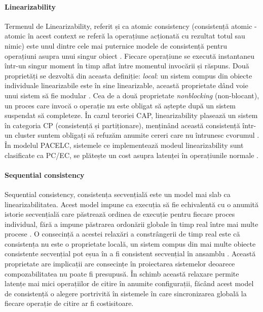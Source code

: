 \paragraph{Linearizability}

Termenul de Linearizability, referit și ca atomic consistency (consistență atomic - atomic în acest context se referă la operațiune acționată cu rezultat totul sau nimic) este unul dintre cele mai puternice modele de consistență pentru operațiuni asupra unui singur obiect \cite{herlihy1990}. Fiecare operațiune se execută instantaneu într-un singur moment în timp aflat între momentul invocării și răspuns. Două proprietăți se dezvoltă din aceasta definiție: \textit{local}: un sistem compus din obiecte individuale linearizabile este în sine linearizable, această proprietate dând voie unui sistem să fie modular \cite{herlihy1990}. Cea de a două proprietate \textit{nonblocking} (non-blocant), un proces care invocă o operație nu este obligat să aștepte după un sistem suspendat să completeze. În cazul teroriei CAP, linearizability plasează un sistem în categoria CP (consistență și partiționare), menținând această consistență într-un cluster suntem obligați să refuzăm anumite cereri care nu întrunesc cvorumul \cite{GilbertLynch2002}. În modelul PACELC, sistemele ce implementează modeul linearizability sunt clasificate ca PC/EC, se plătește un cost asupra latenței în operațiunile normale \cite{abadi_consistency_2012}.

\paragraph{Sequential consistency}

Sequential consistency, consistența secvențială este un model mai slab ca linearizabilitatea. Acest model impune ca execuția să fie echivalentă cu o anumită istorie secvențială care păstrează ordinea de execuție pentru fiecare proces individual, fără a impune păstrarea ordonării globale în timp real între mai multe procese \cite{herlihy1990}. O consecință a acestei relaxări a constrângerii de timp real este că consistența nu este o proprietate locală, un sistem compus din mai multe obiecte consistente secvențial pot eșua în a fi consistent secvențial în ansamblu \cite{herlihy1990}. Această proprietate are implicații are consecințe în proiectarea sistemelor deoarece compozabilitatea nu poate fi presupusă. În schimb această relaxare permite latențe mai mici operațiilor de citire în anumite configurații, făcând acest model de consistență o alegere portrivită în sistemele în care sincronizarea globală la fiecare operație de citire ar fi costisitoare.

